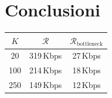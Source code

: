 \FloatBarrier\vspace{35px}\section{Conclusioni}

\begin{table}
    \renewcommand{\arraystretch}{1.5}
    \centering
    \begin{tabular}{| c | c c |}
        \hline
        $K$ & $\mathcal{R}$ & $\mathcal{R}_{\text{bottleneck}}$ \\\hline\hline
        20  & 319\,Kbps & 27\,Kbps \\
        100 & 214\,Kbps & 18\,Kbps \\
        250 & 149\,Kbps & 12\,Kbps \\
        \hline

    \end{tabular}
    \renewcommand{\arraystretch}{1}
\end{table}



